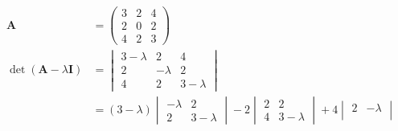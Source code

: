 \documentclass{article}
\begin{document}
\setcounter{subsubsection}{42}
\subsubsection{}

\begin{align*}
  \mathbf{A}                             & = \begin{pmatrix}
                                               3 & 2 & 4 \\
                                               2 & 0 & 2 \\
                                               4 & 2 & 3
                                             \end{pmatrix}                                                                                       \\
  \det (\mathbf{A} - \lambda \mathbf{I}) & = \begin{vmatrix}
                                               3 - \lambda & 2        & 4           \\
                                               2           & -\lambda & 2           \\
                                               4           & 2        & 3 - \lambda
                                             \end{vmatrix}                                                                 \\
                                         & = (3 - \lambda) \begin{vmatrix}
                                                             -\lambda & 2           \\
                                                             2        & 3 - \lambda
                                                           \end{vmatrix} - 2 \begin{vmatrix}
                                                                               2 & 2           \\
                                                                               4 & 3 - \lambda
                                                                             \end{vmatrix} + 4 \begin{vmatrix}
                                                                                                 2 & -\lambda \\

\end{vmatrix}
\end{align*}
\end{document}

